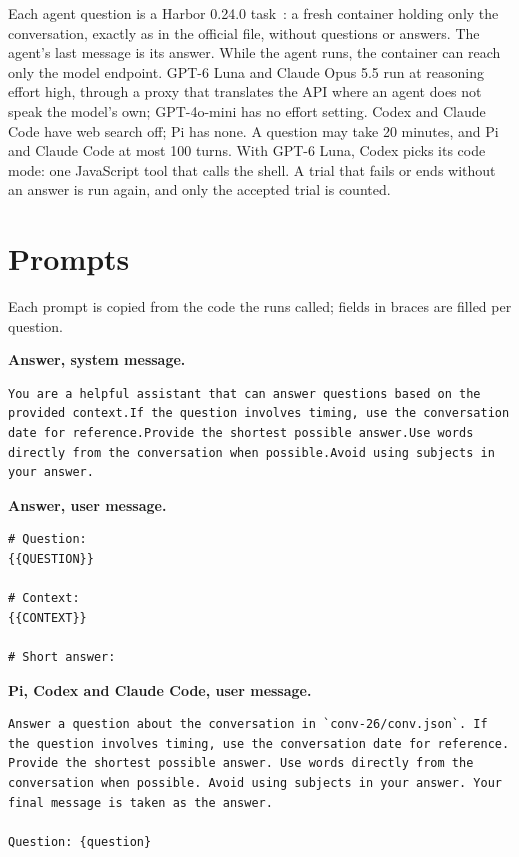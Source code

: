 \documentclass[11pt]{article}
\begin{document}
Each agent question is a Harbor 0.24.0 task~\citep{harbor2026}: a fresh container holding only the conversation, exactly as in the official file, without questions or answers. The agent's last message is its answer. While the agent runs, the container can reach only the model endpoint. GPT-6 Luna and Claude Opus 5.5 run at reasoning effort high, through a proxy that translates the API where an agent does not speak the model's own; GPT-4o-mini has no effort setting. Codex and Claude Code have web search off; Pi has none. A question may take 20 minutes, and Pi and Claude Code at most 100 turns. With GPT-6 Luna, Codex picks its code mode: one JavaScript tool that calls the shell. A trial that fails or ends without an answer is run again, and only the accepted trial is counted.

\section{Prompts}
\label{app:prompts}

Each prompt is copied from the code the runs called; fields in braces are filled per question.

\medskip\noindent\textbf{Answer, system message.}
\begin{lstlisting}
You are a helpful assistant that can answer questions based on the provided context.If the question involves timing, use the conversation date for reference.Provide the shortest possible answer.Use words directly from the conversation when possible.Avoid using subjects in your answer.
\end{lstlisting}

\medskip\noindent\textbf{Answer, user message.}
\begin{lstlisting}
# Question:
{{QUESTION}}

# Context:
{{CONTEXT}}

# Short answer:
\end{lstlisting}

\medskip\noindent\textbf{Pi, Codex and Claude Code, user message.}
\begin{lstlisting}
Answer a question about the conversation in `conv-26/conv.json`. If the question involves timing, use the conversation date for reference. Provide the shortest possible answer. Use words directly from the conversation when possible. Avoid using subjects in your answer. Your final message is taken as the answer.

Question: {question}
\end{lstlisting}
\end{document}
